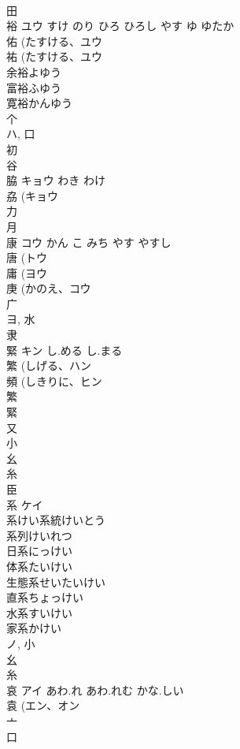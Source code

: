 \documentclass[8pt]{extreport}
\begin{document}
\begin{CJK}{UTF8}{min}
\\	田 
\\	裕	ユウ	すけ のり ひろ ひろし やす ゆ ゆたか	
\\	佑 (たすける、ユウ 
\\	祐 (たすける、ユウ 
\\	余裕よゆう
\\	富裕ふゆう
\\	寛裕かんゆう
\\	个 
\\	ハ, 口 
\\	初 
\\	谷 
\\	脇	キョウ	わき わけ	
\\	劦 (キョウ 
\\	力 
\\	月 
\\	康	コウ	かん こ みち やす やすし	
\\	唐 (トウ 
\\	庸 (ヨウ 
\\	庚 (かのえ、コウ 
\\	广 
\\	ヨ, 水 
\\	隶 
\\	緊	キン	し.める し.まる	
\\	繁 (しげる、ハン 
\\	頻 (しきりに、ヒン 
\\	繁 
\\	緊 
\\	又 
\\	小 
\\	幺 
\\	糸 
\\	臣 
\\	系	ケイ		
\\	系けい系統けいとう
\\	系列けいれつ
\\	日系にっけい
\\	体系たいけい
\\	生態系せいたいけい
\\	直系ちょっけい
\\	水系すいけい
\\	家系かけい
\\	ノ, 小 
\\	幺 
\\	糸 
\\	哀	アイ	あわ.れ あわ.れむ かな.しい	
\\	袁 (エン、オン 
\\	亠 
\\	口 

\end{CJK}
\end{document}
